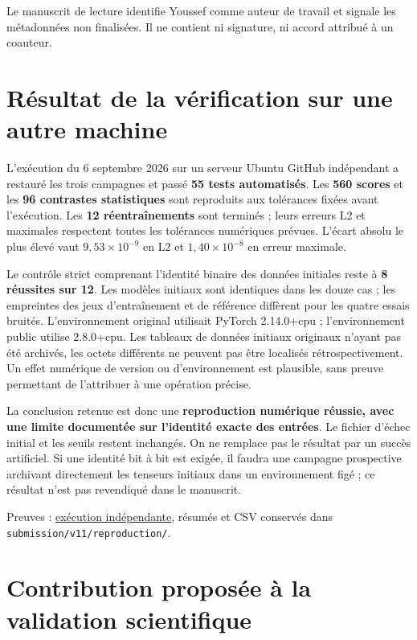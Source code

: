 \documentclass[
  11pt,
]{article}
\begin{document}
Le manuscrit de lecture identifie Youssef comme auteur de travail et
signale les métadonnées non finalisées. Il ne contient ni signature, ni
accord attribué à un coauteur.

\hypertarget{ruxe9sultat-de-la-vuxe9rification-sur-une-autre-machine}{%
\section{Résultat de la vérification sur une autre
machine}\label{ruxe9sultat-de-la-vuxe9rification-sur-une-autre-machine}}

L'exécution du 6 septembre 2026 sur un serveur Ubuntu GitHub indépendant
a restauré les trois campagnes et passé \textbf{55 tests automatisés}.
Les \textbf{560 scores} et les \textbf{96 contrastes statistiques} sont
reproduits aux tolérances fixées avant l'exécution. Les \textbf{12
réentraînements} sont terminés ; leurs erreurs L2 et maximales
respectent toutes les tolérances numériques prévues. L'écart absolu le
plus élevé vaut \(9{,}53\times10^{-9}\) en L2 et \(1{,}40\times10^{-8}\)
en erreur maximale.

Le contrôle strict comprenant l'identité binaire des données initiales
reste à \textbf{8 réussites sur 12}. Les modèles initiaux sont
identiques dans les douze cas ; les empreintes des jeux d'entraînement
et de référence diffèrent pour les quatre essais bruités.
L'environnement original utilisait PyTorch 2.14.0+cpu ; l'environnement
public utilise 2.8.0+cpu. Les tableaux de données initiaux originaux
n'ayant pas été archivés, les octets différents ne peuvent pas être
localisés rétrospectivement. Un effet numérique de version ou
d'environnement est plausible, sans preuve permettant de l'attribuer à
une opération précise.

La conclusion retenue est donc une \textbf{reproduction numérique
réussie, avec une limite documentée sur l'identité exacte des entrées}.
Le fichier d'échec initial et les seuils restent inchangés. On ne
remplace pas le résultat par un succès artificiel. Si une identité bit à
bit est exigée, il faudra une campagne prospective archivant directement
les tenseurs initiaux dans un environnement figé ; ce résultat n'est pas
revendiqué dans le manuscrit.

Preuves :
\href{https://github.com/ucef90/Doctorat/actions/runs/34021530276}{exécution
indépendante}, résumés et CSV conservés dans
\texttt{submission/v11/reproduction/}.

\hypertarget{contribution-proposuxe9e-uxe0-la-validation-scientifique}{%
\section{Contribution proposée à la validation
scientifique}\label{contribution-proposuxe9e-uxe0-la-validation-scientifique}}
\end{document}
